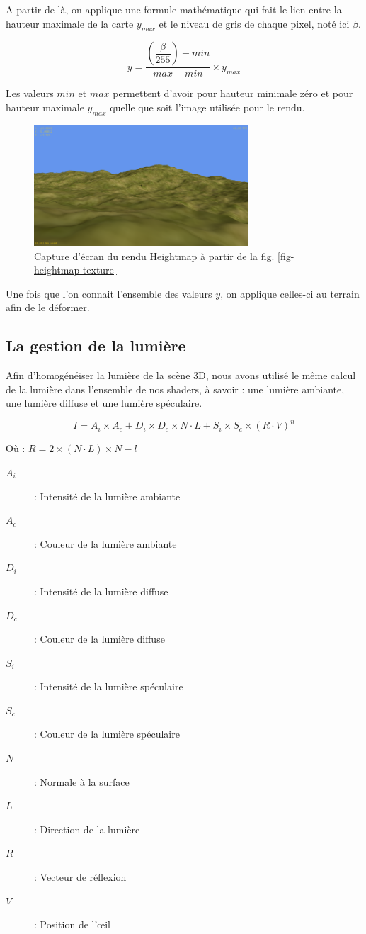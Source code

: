 \documentclass[11pt]{report}
\begin{document}
A partir de là, on applique une formule mathématique qui fait le lien entre la hauteur maximale de la carte \( y_{max} \) et le niveau de gris de chaque pixel, noté ici \( \beta \).

\[
y = \dfrac{\left(\dfrac{\beta}{255}\right) - min}{max - min} \times y_{max}
\]

Les valeurs \( min \) et \( max \) permettent d'avoir pour hauteur minimale zéro et pour hauteur maximale \( y_{max} \) quelle que soit l'image utilisée pour le rendu.

\begin{figure}[htbp]
\centering
\includegraphics[width=8cm]{heightmap-rendu.png}
\caption{Capture d'écran du rendu Heightmap à partir de la fig. \ref{fig-heightmap-texture}}
\end{figure}

Une fois que l'on connait l'ensemble des valeurs \( y \), on applique celles-ci au terrain afin de le déformer.

\subsection{La gestion de la lumière}

Afin d'homogénéiser la lumière de la scène 3D, nous avons utilisé le même calcul de la lumière dans l'ensemble de nos shaders, à savoir : une lumière ambiante, une lumière diffuse et une lumière spéculaire.

\[ I=A_{i}\times A_{c}+D_{i}\times D_{c}\times N\cdot L + S_{i}\times S_{c} \times \left(R\cdot V\right)^{n} \]

Où : \( R=2\times \left(N\cdot L\right)\times N-l \)

\begin{description}
\item[\(A_{i}\)] : Intensité de la lumière ambiante
\item[\(A_{c}\)] : Couleur de la lumière ambiante
\item[\(D_{i}\)] : Intensité de la lumière diffuse
\item[\(D_{c}\)] : Couleur de la lumière diffuse
\item[\(S_{i}\)] : Intensité de la lumière spéculaire
\item[\(S_{c}\)] : Couleur de la lumière spéculaire
\item[\(N\)] : Normale à la surface
\item[\(L\)] : Direction de la lumière
\item[\(R\)] : Vecteur de réflexion
\item[\(V\)] : Position de l'œil
\end{description}
\end{document}
